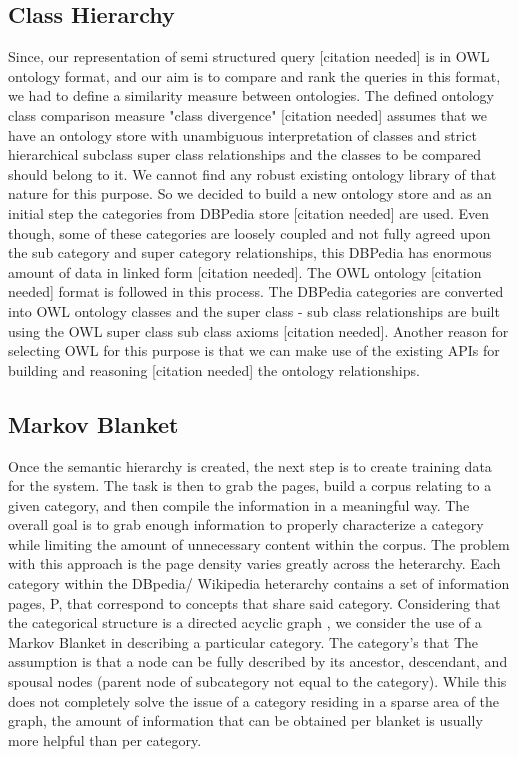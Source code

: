 \documentclass{www2010-submission}
\begin{document}
\subsection{Class Hierarchy} 
Since, our representation of semi structured query [citation needed] is in OWL ontology format, and our aim is to compare and rank the queries in this format, we had to define a similarity measure between ontologies. The defined ontology class comparison measure "class divergence" [citation needed] assumes that we have an ontology store with unambiguous interpretation of classes and strict hierarchical subclass super class relationships and the classes to be compared should belong to it. We cannot find any robust existing ontology library of that nature for this purpose. So we decided to build a new ontology store and as an initial step the categories from DBPedia store [citation needed] are used. Even though, some of these categories are loosely coupled and not fully agreed upon the sub category and super category relationships, this DBPedia has enormous amount of data in linked form [citation needed]. The OWL ontology [citation needed] format is followed in this process. The DBPedia categories are converted into OWL ontology classes and the super class - sub class relationships are built using the OWL super class sub class axioms [citation needed]. Another reason for selecting OWL for this purpose is that we can make use of the existing APIs for building and reasoning [citation needed] the ontology relationships.    



\subsection{Markov Blanket}
Once the semantic hierarchy is created, the next step is to create training data for the system. The task is then to grab the pages, build a corpus relating to a given category, and then compile the information in a meaningful way. The overall goal is to grab enough information to properly characterize a category while limiting the amount of unnecessary content within the corpus. The problem with this approach is the page density varies greatly across the heterarchy. Each category within the DBpedia/ Wikipedia heterarchy contains a set of information pages, P, that correspond to concepts that share said category. Considering that the categorical structure is a directed acyclic graph \cite{Suchanek07yago:a}, we consider the use of a Markov Blanket \cite{Friedman97bayesiannetwork} in describing a particular category. The category's that The assumption is that a node can be fully described by its ancestor, descendant, and spousal nodes (parent node of subcategory not equal to the category). While this does not completely solve the issue of a category residing in a sparse area of the graph, the amount of information that can be obtained per blanket is usually more helpful than per category.
\end{document}
